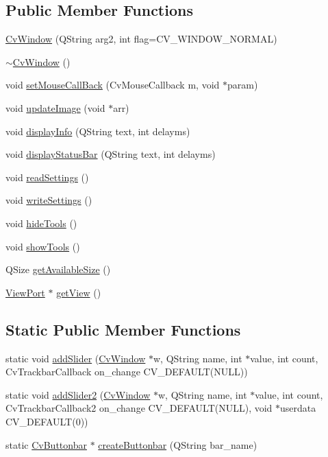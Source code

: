 \subsection*{Public Member Functions}
\begin{DoxyCompactItemize}
\item 
\hyperlink{classCvWindow_a2d516104e7e29c293d53a3797f29fff6}{CvWindow} (QString arg2, int flag=CV\_\-WINDOW\_\-NORMAL)
\item 
\hyperlink{classCvWindow_aac9ea5f91071477dc506ed9a04f758f1}{$\sim$CvWindow} ()
\item 
void \hyperlink{classCvWindow_a8fa9463b57ffb2f049703a6f14e586fb}{setMouseCallBack} (CvMouseCallback m, void $\ast$param)
\item 
void \hyperlink{classCvWindow_a9fc4a9246e0ea710076d2d58851ce1f8}{updateImage} (void $\ast$arr)
\item 
void \hyperlink{classCvWindow_a577841174681451e47735cc125de0af9}{displayInfo} (QString text, int delayms)
\item 
void \hyperlink{classCvWindow_a37a9d43cf4e722abbb32a20fc507c8a9}{displayStatusBar} (QString text, int delayms)
\item 
void \hyperlink{classCvWindow_a7f8fdaeec81ca1900a8878bdfc779f13}{readSettings} ()
\item 
void \hyperlink{classCvWindow_a30c9687c99f22a7f7d9a61c00bf42a57}{writeSettings} ()
\item 
void \hyperlink{classCvWindow_a40da445af152145b663ebdc5a2547351}{hideTools} ()
\item 
void \hyperlink{classCvWindow_a0e911ed5861b7d39a991671af7aabfbc}{showTools} ()
\item 
QSize \hyperlink{classCvWindow_a323bcaa31cfe862e2b13a110248293cc}{getAvailableSize} ()
\item 
\hyperlink{classViewPort}{ViewPort} $\ast$ \hyperlink{classCvWindow_a6bfa17ceb41e3fad856b9dd32d25e048}{getView} ()
\end{DoxyCompactItemize}
\subsection*{Static Public Member Functions}
\begin{DoxyCompactItemize}
\item 
static void \hyperlink{classCvWindow_a05ec675f9af0cee666d6a93e3c58109e}{addSlider} (\hyperlink{classCvWindow}{CvWindow} $\ast$w, QString name, int $\ast$value, int count, CvTrackbarCallback on\_\-change CV\_\-DEFAULT(NULL))
\item 
static void \hyperlink{classCvWindow_aeca1caf779085a23606e45bf76bbb265}{addSlider2} (\hyperlink{classCvWindow}{CvWindow} $\ast$w, QString name, int $\ast$value, int count, CvTrackbarCallback2 on\_\-change CV\_\-DEFAULT(NULL), void $\ast$userdata CV\_\-DEFAULT(0))
\item 
static \hyperlink{classCvButtonbar}{CvButtonbar} $\ast$ \hyperlink{classCvWindow_a219c9032d1611f4e394eae3dea4011ab}{createButtonbar} (QString bar\_\-name)
\end{DoxyCompactItemize}
